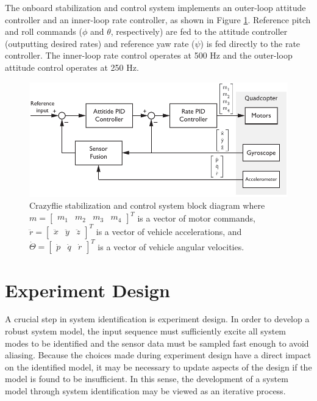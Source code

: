 The onboard stabilization and control system implements an outer-loop attitude controller and an inner-loop rate controller, as shown in Figure \ref{fig:control_system_block_diagram}. Reference pitch and roll commands ($\phi$ and $\theta$, respectively) are fed to the attitude controller (outputting desired rates) and reference yaw rate ($\dot\psi$) is fed directly to the rate controller. The inner-loop rate control operates at 500 Hz and the outer-loop attitude control operates at 250 Hz.
\begin{figure}[htb!]
	\centering
	\includegraphics{../fig/crazyflie_control_system_block_diagram.pdf}
	\caption[Crazyflie stabilization and control system block diagram.]{Crazyflie stabilization and control system block diagram where $m = \begin{bmatrix}m_1 & m_2 & m_3 & m_4\end{bmatrix}^T$ is a vector of motor commands, $\ddot{r} = \begin{bmatrix}\ddot{x}&\ddot{y}&\ddot{z}\end{bmatrix}^T$ is a vector of vehicle accelerations, and $\dot\Theta = \begin{bmatrix}\dot{p}&\dot{q}&\dot{r}\end{bmatrix}^T$ is a vector of vehicle angular velocities.}
	\label{fig:control_system_block_diagram}
\end{figure}


\section{Experiment Design}
A crucial step in system identification is experiment design. In order to develop a robust system model, the input sequence must sufficiently excite all system modes to be identified and the sensor data must be sampled fast enough to avoid aliasing. Because the choices made during experiment design have a direct impact on the identified model, it may be necessary to update aspects of the design if the model is found to be insufficient. In this sense, the development of a system model through system identification may be viewed as an iterative process.


